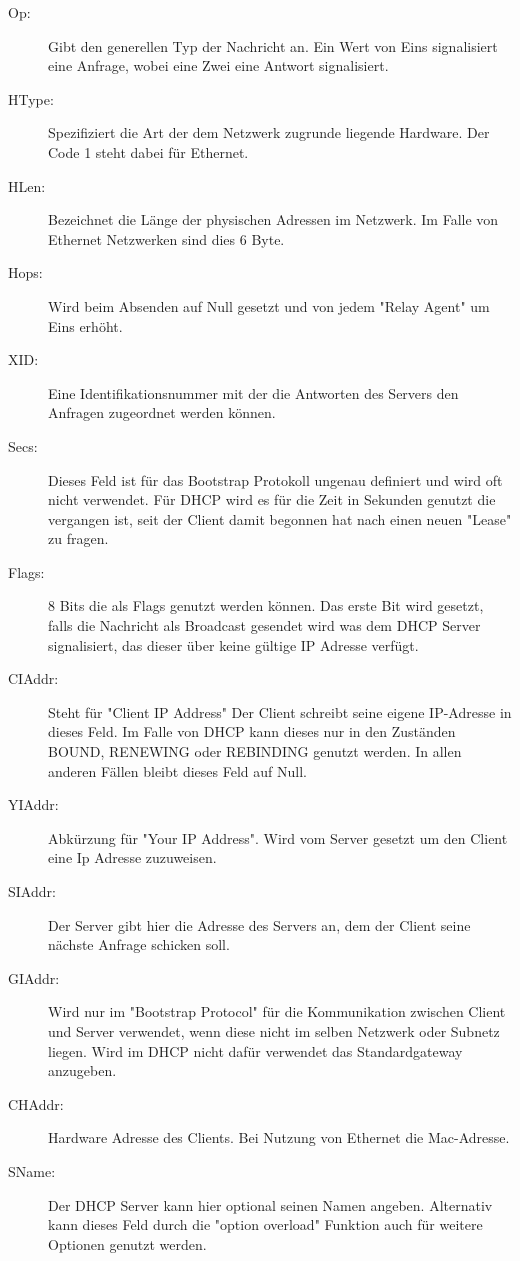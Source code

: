 \begin{description}

\item[Op: ] Gibt den generellen Typ der Nachricht an. Ein Wert von Eins signalisiert eine Anfrage, wobei eine Zwei eine Antwort signalisiert.

\item[HType: ] Spezifiziert die Art der dem Netzwerk zugrunde liegende Hardware. Der Code 1 steht dabei für Ethernet. 
\item[HLen: ] Bezeichnet die Länge der physischen Adressen im Netzwerk. Im Falle von Ethernet Netzwerken sind dies 6 Byte. 
\item[Hops: ] Wird beim Absenden auf Null gesetzt und von jedem {}"Relay Agent" um Eins erhöht. 
\item[XID: ] Eine Identifikationsnummer mit der die Antworten des Servers den Anfragen zugeordnet werden können.
\item[Secs: ] Dieses Feld ist für das Bootstrap Protokoll ungenau definiert und wird oft nicht verwendet. Für DHCP wird es für die Zeit in Sekunden genutzt die vergangen ist, seit der Client damit begonnen hat nach einen neuen {}"Lease{}" zu fragen. 
\item[Flags: ] 8 Bits die als Flags genutzt werden können. Das erste Bit wird gesetzt, falls die Nachricht als Broadcast gesendet wird was dem DHCP Server signalisiert, das dieser über keine gültige IP Adresse verfügt.
\item[CIAddr: ] Steht für {}"Client IP Address"{} Der Client schreibt seine eigene IP-Adresse in dieses Feld. Im Falle von DHCP kann dieses nur in den Zuständen BOUND, RENEWING oder REBINDING genutzt werden. In allen anderen Fällen bleibt dieses Feld auf Null.
\item[YIAddr: ] Abkürzung für "Your IP Address". Wird vom Server gesetzt um den Client eine Ip Adresse zuzuweisen. 
\item[SIAddr: ] Der Server gibt hier die Adresse des Servers an, dem der Client seine nächste Anfrage schicken soll. 
\item[GIAddr: ] Wird nur im {}"Bootstrap Protocol{}" für die Kommunikation zwischen Client und Server verwendet, wenn diese nicht im selben Netzwerk oder Subnetz liegen. Wird im DHCP nicht dafür verwendet das Standardgateway anzugeben. 
\item[CHAddr: ] Hardware Adresse des Clients. Bei Nutzung von Ethernet die Mac-Adresse. 
\item[SName: ] Der DHCP Server kann hier optional seinen Namen angeben. Alternativ kann dieses Feld durch die {}"option overload"{} Funktion auch für weitere Optionen genutzt werden.

\end{description}
